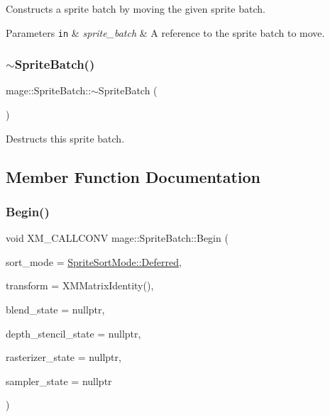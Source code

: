 Constructs a sprite batch by moving the given sprite batch.


\begin{DoxyParams}[1]{Parameters}
\mbox{\tt in}  & {\em sprite\+\_\+batch} & A reference to the sprite batch to move. \\
\hline
\end{DoxyParams}
\hypertarget{classmage_1_1_sprite_batch_a1c284e2c0ed96081f9f2fb1f84e5817f}{}\label{classmage_1_1_sprite_batch_a1c284e2c0ed96081f9f2fb1f84e5817f} 
\subsubsection{\texorpdfstring{$\sim$\+Sprite\+Batch()}{~SpriteBatch()}}
{\footnotesize\ttfamily mage\+::\+Sprite\+Batch\+::$\sim$\+Sprite\+Batch (\begin{DoxyParamCaption}{ }\end{DoxyParamCaption})\hspace{0.3cm}{\ttfamily [default]}}

Destructs this sprite batch. 

\subsection{Member Function Documentation}
\hypertarget{classmage_1_1_sprite_batch_a76458df59d4fa6fe99d4dae375bf0fc5}{}\label{classmage_1_1_sprite_batch_a76458df59d4fa6fe99d4dae375bf0fc5} 
\subsubsection{\texorpdfstring{Begin()}{Begin()}}
{\footnotesize\ttfamily void X\+M\+\_\+\+C\+A\+L\+L\+C\+O\+NV mage\+::\+Sprite\+Batch\+::\+Begin (\begin{DoxyParamCaption}\item[{\hyperlink{namespacemage_a256fa5833eecc408923de7ffadb5e014}{Sprite\+Sort\+Mode}}]{sort\+\_\+mode = {\ttfamily \hyperlink{namespacemage_a256fa5833eecc408923de7ffadb5e014a4ed71db54748b36eeb398876b0c747ac}{Sprite\+Sort\+Mode\+::\+Deferred}},  }\item[{F\+X\+M\+M\+A\+T\+R\+IX}]{transform = {\ttfamily XMMatrixIdentity()},  }\item[{I\+D3\+D11\+Blend\+State $\ast$}]{blend\+\_\+state = {\ttfamily nullptr},  }\item[{I\+D3\+D11\+Depth\+Stencil\+State $\ast$}]{depth\+\_\+stencil\+\_\+state = {\ttfamily nullptr},  }\item[{I\+D3\+D11\+Rasterizer\+State $\ast$}]{rasterizer\+\_\+state = {\ttfamily nullptr},  }\item[{I\+D3\+D11\+Sampler\+State $\ast$}]{sampler\+\_\+state = {\ttfamily nullptr} }\end{DoxyParamCaption})}

